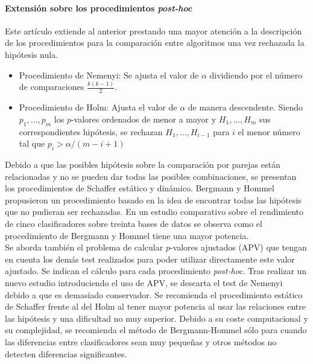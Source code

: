 \paragraph{Extensión sobre los procedimientos \textit{post-hoc}} \cite{GARCIAHERRERA08} Este artículo extiende al anterior prestando una mayor atención a la descripción de los procedimientos para la comparación entre algoritmos una vez rechazada la hipótesis nula. 
	\begin{itemize}
	\item Procedimiento de Nemenyi: Se ajusta el valor de $\alpha$ dividiendo por el número de comparaciones $\frac{k(k-1)}{2}$. 
	\item Procedimiento de Holm: Ajusta el valor de $\alpha$ de manera descendente. Siendo $p_1, \dots, p_m$ los $p$-valores ordenados de menor a mayor y $H_1, \dots, H_m$ sus correspondientes hipótesis, se rechazan $H_1, \dots, H_{i-1}$ para $i$ el menor número tal que $p_i > \alpha/(m-i+1)$
	\end{itemize}
	
	Debido a que las posibles hipótesis sobre la comparación por parejas están relacionadas y no se pueden dar todas las posibles combinaciones, se presentan los procedimientos de Schaffer estático y dinámico. Bergmann y Hommel propusieron un procedimiento basado en la idea de encontrar todas las hipótesis que no pudieran ser rechazadas. En un estudio comparativo sobre el rendimiento de cinco clasificadores sobre treinta bases de datos se observa como el procedimiento de Bergmann y Hommel tiene una mayor potencia.\\
	Se aborda también el problema de calcular $p$-valores ajustados (APV) que tengan en cuenta los demás test realizados para poder utilizar directamente este valor ajustado. Se indican el cálculo para cada procedimiento \textit{post-hoc}. Tras realizar un nuevo estudio introduciendo el uso de APV, se descarta el test de Nemenyi debido a que es demasiado conservador. Se recomienda el procedimiento estático de Schaffer frente al del Holm al tener mayor potencia al usar las relaciones entre las hipótesis y una dificultad no muy superior. Debido a su coste computacional y su complejidad, se recomienda el método de Bergmann-Hommel sólo para cuando las diferencias entre clasificadores sean muy pequeñas y otros métodos no detecten diferencias significantes.

